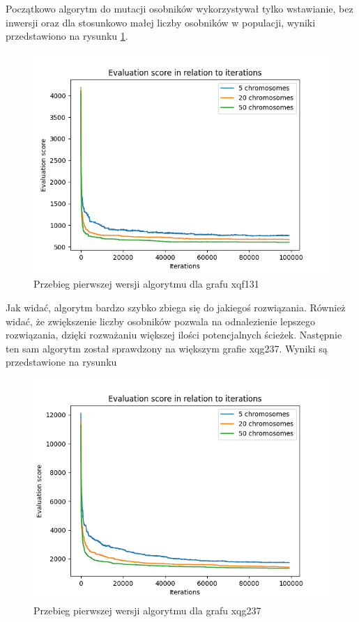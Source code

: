 \documentclass[11pt]{article}
\begin{document}
Początkowo algorytm do mutacji osobników wykorzystywał tylko wstawianie, bez
inwersji oraz dla stosunkowo małej liczby osobników w populacji, wyniki
przedstawiono na rysunku \cref{fig:131_no_inverse}.
\begin{figure}[h]
    \centering
    \includegraphics[scale=0.9]{img/131_no_inverse.png}
    \caption{Przebieg pierwszej wersji algorytmu dla grafu xqf131}
    \label{fig:131_no_inverse}
\end{figure}
Jak widać, algorytm bardzo szybko zbiega się do jakiegoś rozwiązania. Również
widać, że zwiększenie liczby osobników pozwala na odnalezienie lepszego
rozwiązania, dzięki rozważaniu większej ilości potencjalnych ścieżek.
Następnie ten sam algorytm został sprawdzony na większym grafie xqg237. Wyniki
są przedstawione na rysunku 
\begin{figure}[h]
    \centering
    \includegraphics[scale=0.9]{img/237_no_inverse.png}
    \caption{Przebieg pierwszej wersji algorytmu dla grafu xqg237}
    \label{fig:237_no_inverse}
\end{figure}
\end{document}
